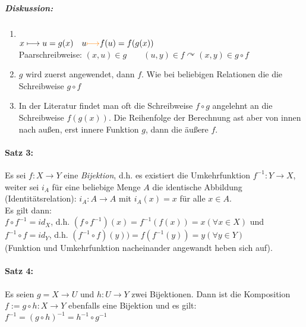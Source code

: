 \subparagraph{Diskussion:}
\begin{enumerate}
\item {} \\
$x \longmapsto u=g(x) \quad u \textcolor{orange}{\longmapsto} f(u) = f(g(x))$\\
Paarschreibweise: $(x,u) \in g \qquad (u,y) \in f \curvearrowright (x,y) \in g \circ f$
\item $g$ wird zuerst angewendet, dann $f$. Wie bei beliebigen Relationen die die Schreibweise $g\circ f$
\item In der Literatur findet man oft die Schreibweise $f\circ g$ angelehnt an die Schreibweise $f(g(x))$. Die Reihenfolge der Berechnung ast aber von innen nach außen, erst innere Funktion $g$, dann die äußere $f$.
\end{enumerate}

\paragraph{Satz 3:} \parskp
Es sei $f: X\rightarrow Y$ eine \emph{Bijektion}, d.h. es existiert die Umkehrfunktion $f^{-1}: Y\rightarrow X$, weiter sei $i_A$ für eine beliebige Menge $A$ die identische Abbildung (Identitätsrelation): $i_A: A\rightarrow A$ mit $i_A(x)=x$ für alle $x\in A$.\\
Es gilt dann: \\
$f \circ f^{-1}= id_X$, d.h. $(f\circ f^{-1})(x)=f^{-1}(f(x))= x (\forall x \in X)$ und \\
$f^{-1}\circ f = id_Y$, d.h. $ (f^{-1}\circ f)(y))= f(f^{-1}(y))=y (\forall y \in Y)$\\
(Funktion und Umkehrfunktion nacheinander angewandt heben sich auf).

\paragraph{Satz 4:} \parskp
Es seien $g=X\rightarrow U$ und $h: U\rightarrow Y$ zwei Bijektionen. Dann ist die Komposition $f:= g \circ h : X\rightarrow Y$ ebenfalls eine Bijektion und es gilt:\\
$\boxed{f^{-1}=(g\circ h)^{-1}=h^{-1}\circ g^{-1}}$
